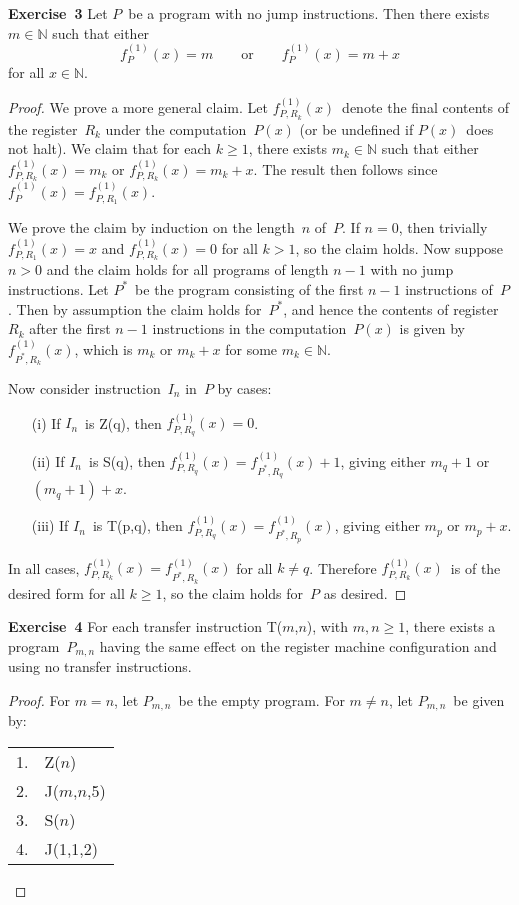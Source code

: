 \documentclass[letterpaper]{article}
\newcommand{\exercise}[2][]{\noindent\textbf{Exercise~{#2}}\ifthenelse{\isempty{#1}}{\textbf{.}}{ ({#1})\textbf{.}}}
\newcommand{\N}{\mathbb{N}}
\newcommand{\func}[2]{f_{#1}^{(#2)}}
\newcommand{\funcr}[3]{f_{{#1},{#2}}^{(#3)}}
\theoremstyle{plain}
\theoremstyle{definition}
\theoremstyle{remark}
\begin{document}
\exercise{3}
Let $P$~be a program with no jump instructions. Then there exists $m\in\N$ such that either
$$\func{P}{1}(x)=m\qquad\text{or}\qquad\func{P}{1}(x)=m+x$$
for all $x\in\N$.
\begin{proof}
We prove a more general claim. Let $\funcr{P}{R_k}{1}(x)$~denote the final contents of the register~$R_k$ under the computation~$P(x)$ (or be undefined if $P(x)$~does not halt). We claim that for each $k\ge1$, there exists $m_k\in\N$ such that either $\funcr{P}{R_k}{1}(x)=m_k$ or $\funcr{P}{R_k}{1}(x)=m_k+x$. The result then follows since $\func{P}{1}(x)=\funcr{P}{R_1}{1}(x)$.

We prove the claim by induction on the length~$n$ of~$P$. If $n=0$, then trivially $\funcr{P}{R_1}{1}(x)=x$ and $\funcr{P}{R_k}{1}(x)=0$ for all $k>1$, so the claim holds. Now suppose $n>0$ and the claim holds for all programs of length $n-1$ with no jump instructions. Let $P^*$~be the program consisting of the first $n-1$ instructions of~$P$. Then by assumption the claim holds for~$P^*$, and hence the contents of register~$R_k$ after the first $n-1$ instructions in the computation~$P(x)$ is given by $\funcr{P^*}{R_k}{1}(x)$, which is $m_k$ or $m_k+x$ for some $m_k\in\N$.

Now consider instruction~$I_n$ in~$P$ by cases:
\begin{enumerate}[itemsep=0pt]
\item[(i)] If $I_n$~is Z(q), then $\funcr{P}{R_q}{1}(x)=0$.
\item[(ii)] If $I_n$~is S(q), then $\funcr{P}{R_q}{1}(x)=\funcr{P^*}{R_q}{1}(x)+1$, giving either $m_q+1$ or $(m_q+1)+x$.
\item[(iii)] If $I_n$~is T(p,q), then $\funcr{P}{R_q}{1}(x)=\funcr{P^*}{R_p}{1}(x)$, giving either $m_p$ or $m_p+x$.
\end{enumerate}
\noindent In all cases, $\funcr{P}{R_k}{1}(x)=\funcr{P^*}{R_k}{1}(x)$ for all $k\ne q$. Therefore $\funcr{P}{R_k}{1}(x)$~is of the desired form for all $k\ge1$, so the claim holds for~$P$ as desired. 
\end{proof}

\exercise{4}
For each transfer instruction T($m$,$n$), with $m,n\ge 1$, there exists a program~$P_{m,n}$ having the same effect on the register machine configuration and using no transfer instructions.
\begin{proof}
For $m=n$, let $P_{m,n}$~be the empty program. For $m\ne n$, let $P_{m,n}$~be given by:
\begin{center}
\begin{tabular}{rl}
1.&Z($n$)\\
2.&J($m$,$n$,5)\\
3.&S($n$)\\
4.&J(1,1,2)
\end{tabular}
\end{center}
\end{proof}
\end{document}
